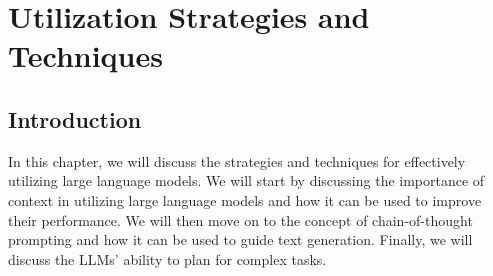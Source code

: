
\chapter{Utilization Strategies and Techniques}
\label{ch:utilization}

\section{Introduction}
\label{sec:ch3-introduction}

In this chapter, we will discuss the strategies and techniques for effectively utilizing large language models.
We will start by discussing the importance of context in utilizing large language models and how it can be used to improve their performance.
We will then move on to the concept of chain-of-thought prompting and how it can be used to guide text generation.
Finally, we will discuss the LLMs' ability to plan for complex tasks.


